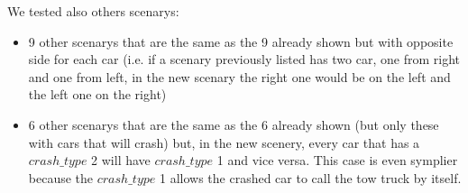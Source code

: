 We tested also others scenarys:
\begin{itemize}
    \item 9 other scenarys that are the same as the 9 already shown but with opposite side for each car (i.e. 
    if a scenary previously listed has two car, one from right and one from left, in the new scenary the right one
    would be on the left and the left one on the right)
    \item 6 other scenarys that are the same as the 6 already shown (but only these with cars that will crash) 
    but, in the new scenery, every car that has a $crash\_type$ 2 will have $crash\_type$ 1 and vice versa. This case
    is even symplier because the $crash\_type$ 1 allows the crashed car to call the tow truck by itself.
\end{itemize}
